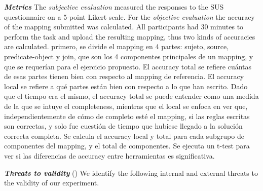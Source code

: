 \noindent\textit{\textbf{Metrics}} 
The \textit{subjective evaluation} measured the responses to the SUS questionnaire on a 5-point Likert scale. 
For the \textit{objective evaluation} the accuracy of the mapping submitted was calculated. All participants had 30 minutes to perform the task and upload the resulting mapping, thus two kinds of accuracies are calculated. 
primero, se divide el mapping en 4 partes: sujeto, source, predicate-object y join, que son los 4 componentes principales de un mapping, y que se requerían para el ejercicio propuesto. El accuracy total se refiere cuántas de esas partes tienen bien con respecto al mapping de referencia. El accuracy local se refiere a qué partes están bien con respecto a lo que han escrito. Dado que el tiempo era el mismo, el accuracy total se puede entender como una medida de la que se intuye el completeness, mientras que el local se enfoca en ver que, independientemente de cómo de completo esté el mapping, si las reglas escritas son correctas, y solo fue cuestión de tiempo que hubiese llegado a la solución correcta completa. Se calcula el accuracy local y total para cada subgrupo de componentes del mapping, y el total de componentes. Se ejecuta un t-test para ver si las diferencias de accuracy entre herramientas es significativa. 

\noindent\textit{\textbf{Threats to validity}} (\cite{creswell2017research}) We identify the following internal and external threats to the validity of our experiment.

